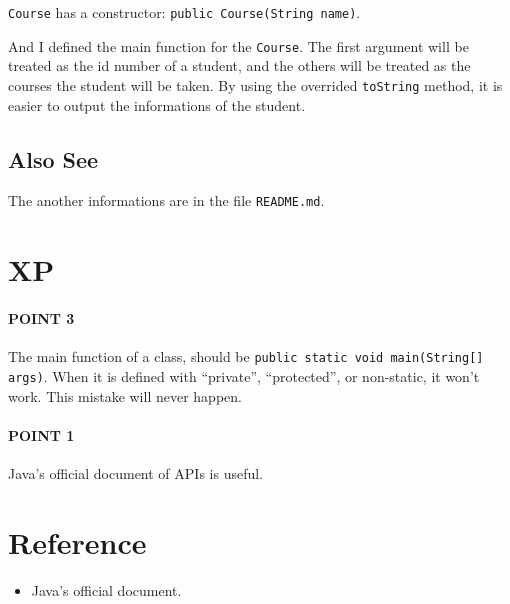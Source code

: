 \documentclass{ctexart}
\begin{document}
\lstinline|Course| has a constructor: \lstinline|public Course(String name)|.

And I defined the main function for the \lstinline|Course|. The first argument will be treated as the id number of a student, and the others will be treated as the courses the student will be taken. By using the overrided \lstinline|toString| method, it is easier to output the informations of the student.

\subsection{Also See}

The another informations are in the file \verb|README.md|.

\section{XP}

\paragraph{POINT 3}

The main function of a class, should be \lstinline|public static void main(String[] args)|. When it is defined with ``private'', ``protected'', or non-static, it won't work. This mistake will never happen.

\paragraph{POINT 1}

Java's official document of APIs is useful.

\section{Reference}

\begin{itemize}
\item Java's official document.
\end{itemize}
\end{document}

